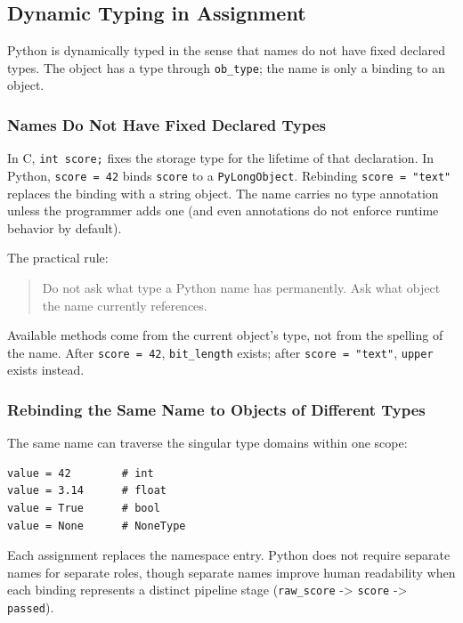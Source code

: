 \subsection{Dynamic Typing in Assignment}

Python is dynamically typed in the sense that names do not have fixed declared types. The object has a type through \texttt{ob\_type}; the name is only a binding to an object.

\subsubsection{Names Do Not Have Fixed Declared Types}

In C, \texttt{int score;} fixes the storage type for the lifetime of that declaration. In Python, \texttt{score = 42} binds \texttt{score} to a \texttt{PyLongObject}. Rebinding \texttt{score = "text"} replaces the binding with a string object. The name carries no type annotation unless the programmer adds one (and even annotations do not enforce runtime behavior by default).

The practical rule:

\begin{quote}
Do not ask what type a Python name has permanently. Ask what object the name currently references.
\end{quote}

Available methods come from the current object's type, not from the spelling of the name. After \texttt{score = 42}, \texttt{bit\_length} exists; after \texttt{score = "text"}, \texttt{upper} exists instead.

\subsubsection{Rebinding the Same Name to Objects of Different Types}

The same name can traverse the singular type domains within one scope:

\begin{verbatim}
value = 42        # int
value = 3.14      # float
value = True      # bool
value = None      # NoneType
\end{verbatim}

Each assignment replaces the namespace entry. Python does not require separate names for separate roles, though separate names improve human readability when each binding represents a distinct pipeline stage (\texttt{raw\_score} -> \texttt{score} -> \texttt{passed}).

